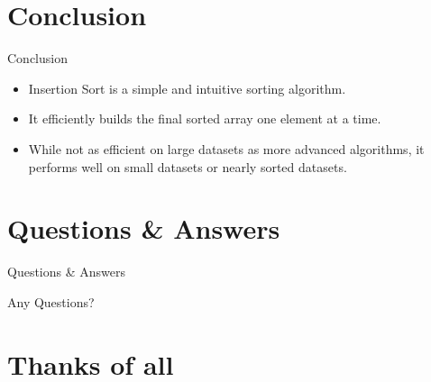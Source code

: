 \documentclass{beamer}
\begin{document}
\section{Conclusion}
\begin{frame}{Conclusion}
  \begin{itemize}
    \item Insertion Sort is a simple and intuitive sorting algorithm.
    \item It efficiently builds the final sorted array one element at a time.
    \item While not as efficient on large datasets as more advanced algorithms, it performs well on small datasets or nearly sorted datasets.
  \end{itemize}
\end{frame}

\section{Questions \& Answers}
\begin{frame}{Questions \& Answers}
  \begin{center}
    \Huge Any Questions?
  \end{center}
\end{frame}

\section{Thanks of all}
\end{document}

